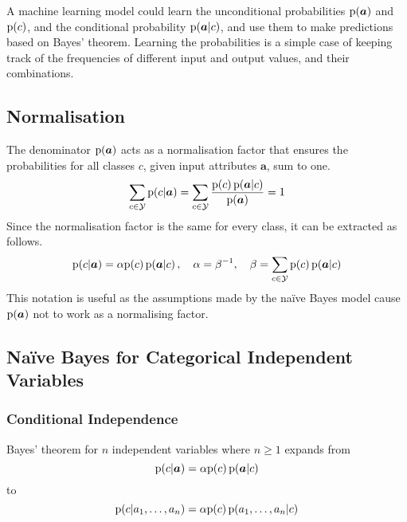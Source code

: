 A machine learning model could learn the unconditional probabilities \( \mathrm{p}\!\left( \boldsymbol{a} \right) \) and \( \mathrm{p}\!\left( c \right) \), and the conditional probability \( \mathrm{p}\!\left( \boldsymbol{a} \vert c \right) \), and use them to make predictions based on Bayes' theorem.
Learning the probabilities is a simple case of keeping track of the frequencies of different input and output values, and their combinations.

\subsection{Normalisation}

The denominator \( \mathrm{p}\!\left( \boldsymbol{a} \right) \) acts as a normalisation factor that ensures the probabilities for all classes \( c \), given input attributes \( \boldsymbol{a} \), sum to one.
\begin{equation*}
  \sum_{c \in \mathcal{Y}} \mathrm{p}\!\left( c \vert \boldsymbol{a} \right) = \sum_{c \in \mathcal{Y}} \frac{\mathrm{p}\!\left( c \right) \mathrm{p}\!\left( \boldsymbol{a} \vert c \right)}{\mathrm{p}\!\left( \boldsymbol{a} \right)} = 1
\end{equation*}
Since the normalisation factor is the same for every class, it can be extracted as follows.
\begin{equation*}
  \mathrm{p}\!\left( c \vert \boldsymbol{a} \right) = \alpha \mathrm{p}\!\left( c \right) \mathrm{p}\!\left( \boldsymbol{a} \vert c \right), \quad \alpha = \beta^{-1}, \quad \beta = \sum_{c \in \mathcal{Y}} \mathrm{p}\!\left( c \right) \mathrm{p}\!\left( \boldsymbol{a} \vert c \right)
\end{equation*}
This notation is useful as the assumptions made by the na\"{i}ve Bayes model cause \( \mathrm{p}\!\left( \boldsymbol{a} \right) \) not to work as a normalising factor.

\subsection{Na\"{i}ve Bayes for Categorical Independent Variables}

\subsubsection{Conditional Independence}

Bayes' theorem for \( n \) independent variables where \( n \geq 1 \) expands from
\begin{equation*}
  \mathrm{p}\!\left( c \vert \boldsymbol{a} \right) = \alpha \mathrm{p}\!\left( c \right) \mathrm{p}\!\left( \boldsymbol{a} \vert c \right)
\end{equation*}
to
\begin{equation*}
  \mathrm{p}\!\left( c \vert a_{1}, \ldots, a_{n} \right) = \alpha \mathrm{p}\!\left( c \right) \mathrm{p}\!\left( a_{1}, \ldots, a_{n} \vert c \right)
\end{equation*}

